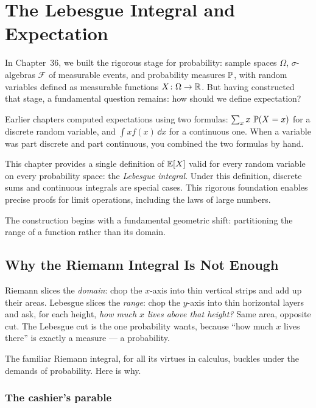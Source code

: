 \chapter{The Lebesgue Integral and Expectation}

In Chapter~36, we built the rigorous stage for probability: sample spaces
$\Omega$, $\sigma$-algebras $\mathcal{F}$ of measurable events, and probability
measures $\P$, with random variables defined as measurable functions
$X\colon\Omega\to\R$. But having constructed that stage, a fundamental question
remains: how should we define expectation?

Earlier chapters computed expectations using two formulas:
$\sum_x x\,\P(X=x)$ for a discrete random variable, and
$\int x f(x)\,\dd x$ for a continuous one. When a variable was part discrete and
part continuous, you combined the two formulas by hand.

This chapter provides a single definition of $\E[X]$
valid for every random variable on every probability space: the \emph{Lebesgue integral}.
Under this definition, discrete sums and continuous integrals are special cases.
This rigorous foundation enables precise proofs for limit operations,
including the laws of large numbers.

The construction begins with a fundamental geometric shift: partitioning the range of
a function rather than its domain.

\section{Why the Riemann Integral Is Not Enough}
\label{ch37:why-lebesgue}

\begin{intuitionbox}
Riemann slices the \emph{domain}: chop the $x$-axis into thin vertical strips
and add up their areas. Lebesgue slices the \emph{range}: chop the $y$-axis into
thin horizontal layers and ask, for each height, \emph{how much $x$ lives above
that height?} Same area, opposite cut. The Lebesgue cut is the one probability
wants, because ``how much $x$ lives there'' is exactly a measure --- a
probability.
\end{intuitionbox}

The familiar Riemann integral, for all its virtues in calculus, buckles under
the demands of probability. Here is why.

\subsection{The cashier's parable}

